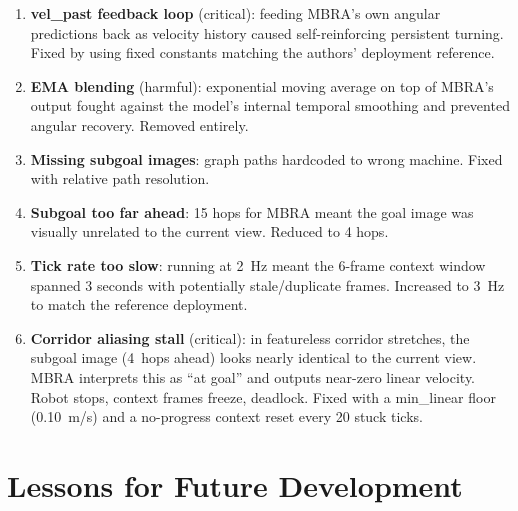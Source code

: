 \documentclass[11pt,a4paper]{article}
\begin{document}
\begin{enumerate}
  \item \textbf{vel\_past feedback loop} (critical): feeding MBRA's own angular
    predictions back as velocity history caused self-reinforcing persistent
    turning.  Fixed by using fixed constants matching the authors' deployment
    reference.

  \item \textbf{EMA blending} (harmful): exponential moving average on top of
    MBRA's output fought against the model's internal temporal smoothing and
    prevented angular recovery.  Removed entirely.

  \item \textbf{Missing subgoal images}: graph paths hardcoded to wrong machine.
    Fixed with relative path resolution.

  \item \textbf{Subgoal too far ahead}: 15 hops for MBRA meant the goal image
    was visually unrelated to the current view.  Reduced to 4 hops.

  \item \textbf{Tick rate too slow}: running at 2~Hz meant the 6-frame context
    window spanned 3 seconds with potentially stale/duplicate frames.
    Increased to 3~Hz to match the reference deployment.

  \item \textbf{Corridor aliasing stall} (critical): in featureless corridor
    stretches, the subgoal image (4~hops ahead) looks nearly identical to the
    current view.  MBRA interprets this as ``at goal'' and outputs near-zero
    linear velocity.  Robot stops, context frames freeze, deadlock.  Fixed with
    a min\_linear floor (0.10~m/s) and a no-progress context reset every 20
    stuck ticks.
\end{enumerate}

\section{Lessons for Future Development}
\end{document}
